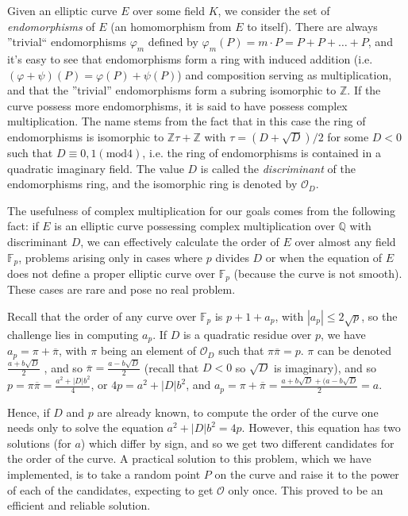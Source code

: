 \documentclass[11pt,english]{article}
\begin{document}
Given an elliptic curve $E$ over some field $K$, we consider the set of \emph{endomorphisms} of $E$ (an homomorphism from $E$ to itself). There are
always ''trivial`` endomorphisms $\varphi_m$ defined by $\varphi_m(P)=m\cdot P=P+P+\dots+P$, and it's easy to see that endomorphisms form a ring
with induced addition (i.e. $(\varphi+\psi)(P)=\varphi(P)+\psi(P)$) and composition serving as multiplication, and that the ''trivial'' endomorphisms form a subring
isomorphic to $\mathbb{Z}$. If the curve possess more endomorphisms, it is said to have possess complex multiplication. The name stems from
the fact that in this case the ring of endomorphisms is isomorphic to $\mathbb{Z}\tau+\mathbb{Z}$ with $\tau = (D+\sqrt{D})/2$ for some $D<0$
such that $D\equiv 0,1 (\mathrm{mod }4)$, i.e. the ring of endomorphisms is contained in a quadratic imaginary field. The value $D$ is called the \emph{discriminant} of the
endomorphisms ring, and the isomorphic ring is denoted by $\mathcal{O}_D$.

The usefulness of complex multiplication for our goals comes from the following fact: if $E$ is an elliptic curve possessing complex multiplication over $\mathbb{Q}$
with discriminant $D$, we can effectively calculate the order of $E$ over almost any field $\mathbb{F}_p$, problems arising only in cases where $p$ divides $D$ or
when the equation of $E$ does not define a proper elliptic curve over $\mathbb{F}_p$ (because the curve is not smooth). These cases are rare and
pose no real problem.

Recall that the order of any curve over $\mathbb{F}_p$ is $p+1+a_p$, with $|a_p|\le2\sqrt{p}$, so the challenge lies in computing $a_p$. If $D$ is
a quadratic residue over $p$, we have $a_p=\pi+\overline{\pi}$, with $\pi$ being an element of $\mathcal{O}_D$ such that $\pi\overline{\pi}=p$.
$\pi$ can be denoted $\frac{a+b\sqrt{D}}{2}$ , and so $\overline{\pi}=\frac{a-b\sqrt{D}}{2}$ (recall that $D<0$ so $\sqrt{D}$ is imaginary),
and so $p=\pi\overline{\pi}=\frac{a^2+|D|b^2}{4}$, or $4p=a^2+|D|b^2$, and  $a_p=\pi+\overline{\pi}=\frac{a+b\sqrt{D}+(a-b\sqrt{D}}{2}=a$.

Hence, if $D$ and $p$ are already known, to compute the order of the curve one needs only to solve the equation $a^2+|D|b^2=4p$. However, this equation
has two solutions (for $a$) which differ by sign, and so we get two different candidates for the order of the curve. A practical solution to this problem, which
we have implemented, is to take a random point $P$ on the curve and raise it to the power of each of the candidates, expecting to get $\mathcal{O}$ only
once. This proved to be an efficient and reliable solution.
\end{document}
